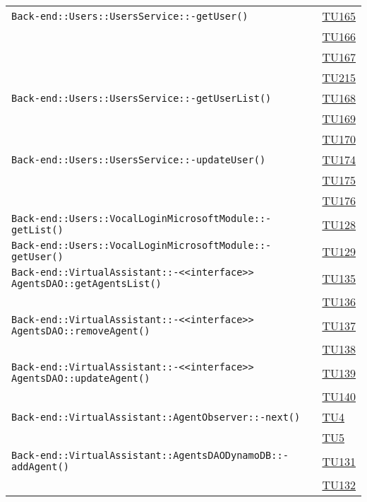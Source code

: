 \begin{longtable}{|>{\centering}m{12cm}|m{1cm}<{\centering}|}
\texttt{Back-end::Users::UsersService::-\linebreak getUser()} & \hyperlink{TU165}{TU165}\\ & \hyperlink{TU166}{TU166}\\ & \hyperlink{TU167}{TU167}\\ & \hyperlink{TU215}{TU215}\\ \hline
\texttt{Back-end::Users::UsersService::-\linebreak getUserList()} & \hyperlink{TU168}{TU168}\\ & \hyperlink{TU169}{TU169}\\ & \hyperlink{TU170}{TU170}\\ \hline
\texttt{Back-end::Users::UsersService::-\linebreak updateUser()} & \hyperlink{TU174}{TU174}\\ & \hyperlink{TU175}{TU175}\\ & \hyperlink{TU176}{TU176}\\ \hline
\texttt{Back-end::Users::VocalLoginMicrosoftModule::-\linebreak getList()} & \hyperlink{TU128}{TU128}\\ \hline
\texttt{Back-end::Users::VocalLoginMicrosoftModule::-\linebreak getUser()} & \hyperlink{TU129}{TU129}\\ \hline
\texttt{Back-end::VirtualAssistant::-\linebreak <<interface>> AgentsDAO::getAgentsList()} & \hyperlink{TU135}{TU135}\\ & \hyperlink{TU136}{TU136}\\ \hline
\texttt{Back-end::VirtualAssistant::-\linebreak <<interface>> AgentsDAO::removeAgent()} & \hyperlink{TU137}{TU137}\\ & \hyperlink{TU138}{TU138}\\ \hline
\texttt{Back-end::VirtualAssistant::-\linebreak <<interface>> AgentsDAO::updateAgent()} & \hyperlink{TU139}{TU139}\\ & \hyperlink{TU140}{TU140}\\ \hline
\texttt{Back-end::VirtualAssistant::AgentObserver::-\linebreak next()} & \hyperlink{TU4}{TU4}\\ & \hyperlink{TU5}{TU5}\\ \hline
\texttt{Back-end::VirtualAssistant::AgentsDAODynamoDB::-\linebreak addAgent()} & \hyperlink{TU131}{TU131}\\ & \hyperlink{TU132}{TU132}\\ \hline

\end{longtable}
